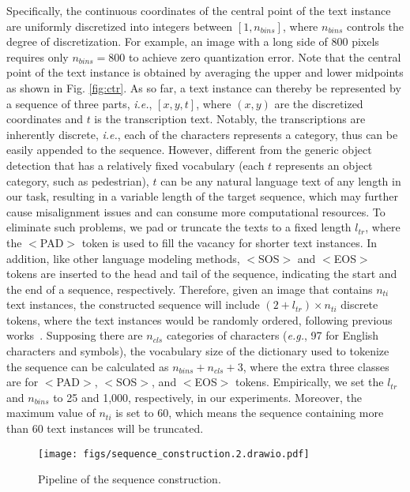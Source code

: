 \documentclass[sigconf]{acmart}
\begin{document}
Specifically, the continuous coordinates of the central point of the text instance are uniformly discretized into integers between $[1, n_{bins}]$, where $n_{bins}$ controls the degree of discretization. For example, an image with a long side of 800 pixels requires only $n_{bins}=800$ to achieve zero quantization error. Note that the central point of the text instance is obtained by averaging the upper and lower midpoints as shown in Fig. \ref{fig:ctr}. As so far, a text instance can thereby be represented by a sequence of three parts, \emph{i.e.}, $[x, y, t]$, where $(x, y)$ are the discretized coordinates and $t$ is the transcription text. Notably, the transcriptions are inherently discrete, \emph{i.e.}, each of the characters represents a category, thus can be easily appended to the sequence. However, different from the generic object detection that has a relatively fixed vocabulary (each $t$ represents an object category, such as pedestrian), $t$ can be any natural language text of any length in our task, resulting in a variable length of the target sequence, which may further cause misalignment issues and can consume more computational resources. To eliminate such problems, we pad or truncate the texts to a fixed length $l_{tr}$, where the $<$PAD$>$ token is used to fill the vacancy for shorter text instances. In addition, like other language modeling methods, $<$SOS$>$ and $<$EOS$>$ tokens are inserted to the head and tail of the sequence, indicating the start and the end of a sequence, respectively. Therefore, given an image that contains $n_{ti}$ text instances, the constructed sequence will include $(2+l_{tr})\times n_{ti}$ discrete tokens, where the text instances would be randomly ordered, following previous works~\cite{chen2021pix2seq}. Supposing there are $n_{cls}$ categories of characters (\emph{e.g.}, 97 for English characters and symbols), the vocabulary size of the dictionary used to tokenize the sequence can be calculated as $n_{bins} + n_{cls} + 3$, where the extra three classes are for $<$PAD$>$, $<$SOS$>$, and $<$EOS$>$ tokens. Empirically, we set the $l_{tr}$ and $n_{bins}$ to 25 and 1,000, respectively, in our experiments. Moreover, the maximum value of $n_{ti}$ is set to 60, which means the sequence containing more than 60 text instances will be truncated.


\begin{figure}[t!]
    \centering
    \texttt{[image: figs/sequence\_construction.2.drawio.pdf]}
    \caption{Pipeline of the sequence construction.}
    \label{fig:seq_constrcut}
\end{figure}
\end{document}
